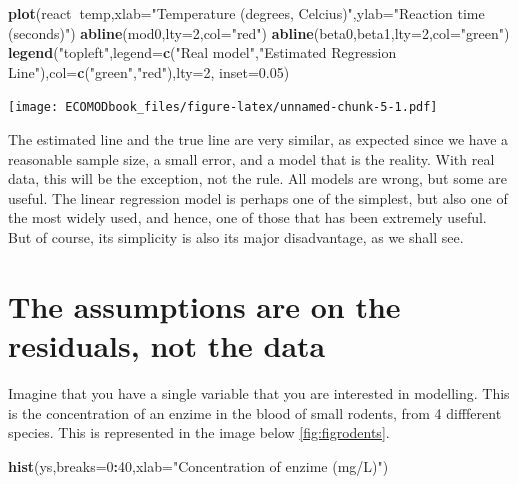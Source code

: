 \documentclass[
]{book}
\newenvironment{Shaded}{\begin{snugshade}}{\end{snugshade}}
\newcommand{\DataTypeTok}[1]{\textcolor[rgb]{0.13,0.29,0.53}{#1}}
\newcommand{\DecValTok}[1]{\textcolor[rgb]{0.00,0.00,0.81}{#1}}
\newcommand{\FloatTok}[1]{\textcolor[rgb]{0.00,0.00,0.81}{#1}}
\newcommand{\KeywordTok}[1]{\textcolor[rgb]{0.13,0.29,0.53}{\textbf{#1}}}
\newcommand{\NormalTok}[1]{#1}
\newcommand{\OperatorTok}[1]{\textcolor[rgb]{0.81,0.36,0.00}{\textbf{#1}}}
\newcommand{\StringTok}[1]{\textcolor[rgb]{0.31,0.60,0.02}{#1}}
\begin{document}
\begin{Shaded}
\begin{Highlighting}[]
\KeywordTok{plot}\NormalTok{(react}\OperatorTok{~}\NormalTok{temp,}\DataTypeTok{xlab=}\StringTok{"Temperature (degrees, Celcius)"}\NormalTok{,}\DataTypeTok{ylab=}\StringTok{"Reaction time (seconds)"}\NormalTok{)}
\KeywordTok{abline}\NormalTok{(mod0,}\DataTypeTok{lty=}\DecValTok{2}\NormalTok{,}\DataTypeTok{col=}\StringTok{"red"}\NormalTok{)}
\KeywordTok{abline}\NormalTok{(beta0,beta1,}\DataTypeTok{lty=}\DecValTok{2}\NormalTok{,}\DataTypeTok{col=}\StringTok{"green"}\NormalTok{)}
\KeywordTok{legend}\NormalTok{(}\StringTok{"topleft"}\NormalTok{,}\DataTypeTok{legend=}\KeywordTok{c}\NormalTok{(}\StringTok{"Real model"}\NormalTok{,}\StringTok{"Estimated Regression Line"}\NormalTok{),}\DataTypeTok{col=}\KeywordTok{c}\NormalTok{(}\StringTok{"green"}\NormalTok{,}\StringTok{"red"}\NormalTok{),}\DataTypeTok{lty=}\DecValTok{2}\NormalTok{, }\DataTypeTok{inset=}\FloatTok{0.05}\NormalTok{)}
\end{Highlighting}
\end{Shaded}

\texttt{[image: ECOMODbook\_files/figure-latex/unnamed-chunk-5-1.pdf]}

The estimated line and the true line are very similar, as expected since we have a reasonable sample size, a small error, and a model that is the reality. With real data, this will be the exception, not the rule. All models are wrong, but some are useful. The linear regression model is perhaps one of the simplest, but also one of the most widely used, and hence, one of those that has been extremely useful. But of course, its simplicity is also its major disadvantage, as we shall see.

\hypertarget{the-assumptions-are-on-the-residuals-not-the-data}{%
\section{The assumptions are on the residuals, not the data}\label{the-assumptions-are-on-the-residuals-not-the-data}}

Imagine that you have a single variable that you are interested in modelling. This is the concentration of an enzime in the blood of small rodents, from 4 diffferent species. This is represented in the image below \ref{fig:figrodents}.

\begin{Shaded}
\begin{Highlighting}[]
\KeywordTok{hist}\NormalTok{(ys,}\DataTypeTok{breaks=}\DecValTok{0}\OperatorTok{:}\DecValTok{40}\NormalTok{,}\DataTypeTok{xlab=}\StringTok{"Concentration of enzime (mg/L)"}\NormalTok{)}
\end{Highlighting}
\end{Shaded}
\end{document}

